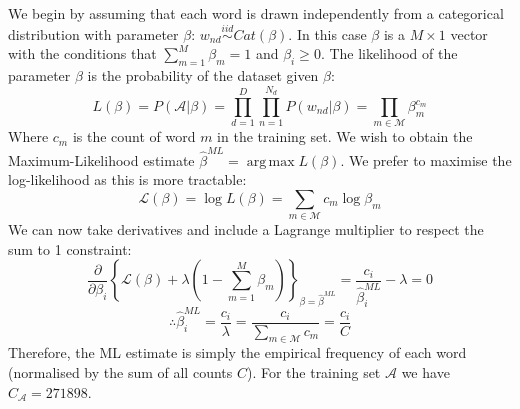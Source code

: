 \documentclass[]{article}
\DeclareMathOperator*{\argmax}{arg\,max}
\newcommand{\Acal}{\mathcal{A}}
\newcommand{\Lcal}{\mathcal{L}}
\newcommand{\Mcal}{\mathcal{M}}
\newcommand{\iid}{\stackrel{iid}{\sim}}
\newcommand{\betaml}{\hat{\beta}^{ML}}
\begin{document}
We begin by assuming that each word is drawn independently from a categorical distribution with parameter $\beta$: $w_{nd} \iid Cat(\beta)$. In this case $\beta$ is a $M \times 1$ vector with the conditions that $\sum_{m=1}^{M} \beta_m = 1$ and $\beta_i \geq 0$. The likelihood of the parameter $\beta$ is the probability of the dataset given $\beta$:
%
\begin{equation}
	L(\beta) = P(\Acal | \beta) = \prod_{d=1}^{D} \prod_{n=1}^{N_d} P(w_{nd} | \beta) = \prod_{m \in \Mcal} \beta_m ^{c_m}
\end{equation}
%
Where $c_m$ is the count of word $m$ in the training set. We wish to obtain the Maximum-Likelihood estimate $\betaml = \argmax L(\beta)$. We prefer to maximise the log-likelihood as this is more tractable:
%
\begin{equation}
	\Lcal(\beta) = \log L(\beta) = \sum_{m \in \Mcal} c_m \log \beta_m
\end{equation}
%
We can now take derivatives and include a Lagrange multiplier to respect the sum to 1 constraint:
%
\begin{equation*}
	\frac{\partial}{\partial \beta_i}  \left\{ \Lcal(\beta) + \lambda \left(1 - \sum_{m=1}^{M} \beta_m \right) \right\}_{\beta = \betaml} = \frac{c_i}{\betaml_i} - \lambda= 0
\end{equation*}
\begin{equation}
	\therefore \betaml_i = \frac{c_i}{\lambda} = \frac{c_i}{\sum_{m \in \Mcal} c_m} = \frac{c_i}{C}
\end{equation}
%
Therefore, the ML estimate is simply the empirical frequency of each word (normalised by the sum of all counts $C$). For the training set $\Acal$ we have $C_\Acal = 271898$.
%
\end{document}
